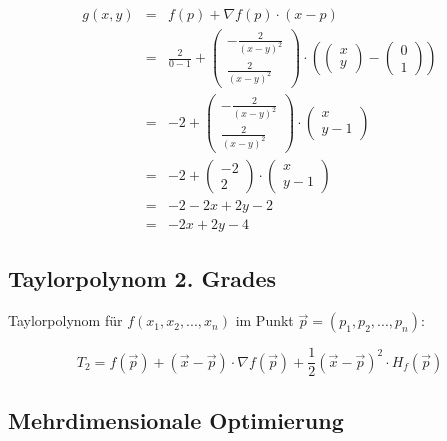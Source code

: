 \begin{eqnarray*}
	g(x,y) &=& f(p) + \nabla f(p) \cdot (x-p) \\
	&=& \frac{2}{0-1} + \left(\begin{array}{c}-\frac{2}{(x-y)^2}\\\frac{2}{(x-y)^2}\end{array}\right) \cdot
	 \left(\left(\begin{array}{c}x\\y\end{array}\right) - \left(\begin{array}{c}0\\1\end{array}\right) \right) \\
	&=& -2 + \left(\begin{array}{c}-\frac{2}{(x-y)^2}\\\frac{2}{(x-y)^2}\end{array}\right) \cdot
	 \left(\begin{array}{c}x\\y-1\end{array}\right)\\
	&=& -2 + \left(\begin{array}{c}-2\\2\end{array}\right) \cdot
	  \left(\begin{array}{c}x\\y-1\end{array}\right)\\
	&=& -2-2x+2y-2 \\
	&=& -2x+2y-4
\end{eqnarray*}


\subsection{Taylorpolynom 2. Grades} %
\label{sub:taylorpolynom_2_grades}

Taylorpolynom für $f(x_1,x_2,...,x_n)$ im Punkt $\overrightarrow{p} = (p_1,p_2,...,p_n)$:

\begin{equation}
	T_2 = f(\overrightarrow{p}) + (\overrightarrow{x}-\overrightarrow{p}) \cdot \nabla f(\overrightarrow{p})+\frac{1}{2}
	(\overrightarrow{x}-\overrightarrow{p})^2 \cdot H_f(\overrightarrow{p})
\end{equation}

\subsection{Mehrdimensionale Optimierung} %
\label{sub:mehrdimensionale_optimierung}


